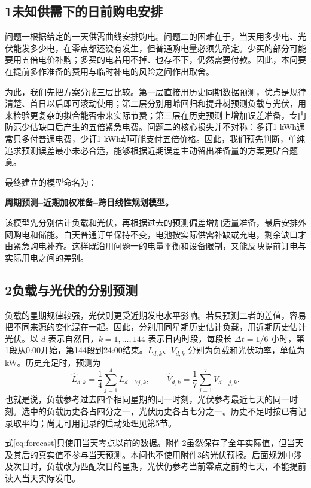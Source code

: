 \subsection*{1\quad 未知供需下的日前购电安排}

问题一根据给定的一天供需曲线安排购电。问题二的困难在于，当天用多少电、光伏能发多少电，在零点都还没有发生，但普通购电量必须先确定。少买的部分可能要用五倍电价补购；多买的电若用不掉、也存不下，仍然需要付款。因此，本问要在提前多作准备的费用与临时补电的风险之间作出取舍。

为此，我们先把方案分成三层比较。第一层直接用历史同期数据预测，优点是规律清楚、首日以后即可滚动使用；第二层分别用岭回归和提升树预测负载与光伏，用来检验更复杂的拟合能否带来实际节费；第三层在历史预测上增加误差准备，专门防范少估缺口后产生的五倍紧急电费。问题二的核心损失并不对称：多订1 kWh通常只多付普通电费，少订1 kWh却可能支付五倍价格。因此，我们预先判断，单纯追求预测误差最小未必合适，能够根据近期误差主动留出准备量的方案更贴合题意。

最终建立的模型命名为：

\textbf{周期预测--近期加权准备--跨日线性规划模型。}

该模型先分别估计负载和光伏，再根据过去的预测偏差增加适量准备，最后安排外网购电和储能。白天普通订单保持不变，电池按实际供需补缺或充电，剩余缺口才由紧急购电补齐。这样既沿用问题一的电量平衡和设备限制，又能反映提前订电与实际用电之间的差别。

\subsection*{2\quad 负载与光伏的分别预测}

负载的星期规律较强，光伏则更受近期发电水平影响。若只预测二者的差值，容易把不同来源的变化混在一起。因此，分别用同星期历史估计负载，用近期历史估计光伏。以 $d$ 表示自然日，$k=1,\ldots,144$ 表示日内时段，每段长 $\Delta t=1/6$ 小时，第1段从0:00开始，第144段到24:00结束。$L_{d,k}$、$V_{d,k}$ 分别为负载和光伏功率，单位为 kW。历史充足时，预测为
\begin{equation}
\widehat L_{d,k}=\frac14\sum_{j=1}^{4}L_{d-7j,k},\qquad
\widehat V_{d,k}=\frac17\sum_{j=1}^{7}V_{d-j,k}.
\label{eq:forecast}
\end{equation}
也就是说，负载参考过去四个相同星期的同一时刻，光伏参考最近七天的同一时刻。选中的负载历史各占四分之一，光伏历史各占七分之一。历史不足时按已有记录取平均；尚无可用记录的启动处理见第5节。

式\eqref{eq:forecast}只使用当天零点以前的数据。附件2虽然保存了全年实际值，但当天及其后的真实值不参与当天预测。本问也不使用附件3的光伏预报。后面规划中涉及次日时，负载改为匹配次日的星期，光伏仍参考当前零点之前的七天，不能提前读入当天实际发电。


